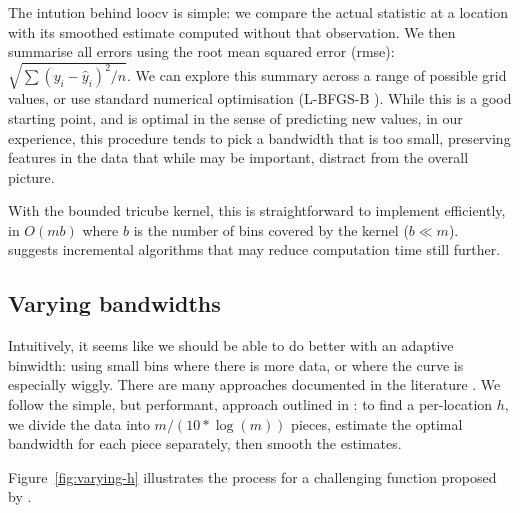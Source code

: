 \documentclass[journal]{vgtc}                %
\begin{document}
The intution behind loocv is simple: we compare the actual statistic at a location with its smoothed estimate computed without that observation. We then summarise all errors using the root mean squared error (rmse): $\sqrt{ \sum (y_i - \hat{y}_i)^2 / n}$. We can explore this summary across a range of possible grid values, or use standard numerical optimisation (L-BFGS-B \citep{byrd:1995}). While this is a good starting point, and is optimal in the sense of predicting new values, in our experience, this procedure tends to pick a bandwidth that is too small, preserving features in the data that while may be important, distract from the overall picture.

With the bounded tricube kernel, this is straightforward to implement efficiently, in $O(m b)$ where $b$ is the number of bins covered by the kernel ($b \ll m$). \citep{fan:1994} suggests incremental algorithms that may reduce computation time still further.

\subsection{Varying bandwidths}

Intuitively, it seems like we should be able to do better with an adaptive binwidth: using small bins where there is more data, or where the curve is especially wiggly. There are many approaches documented in the literature  \citep{terrell:1992, brockmann:1993,schucany:1995,herrmann:1997}. We follow the simple, but performant, approach outlined in \citep{fan:1995}: to find a per-location $h$, we divide the data into $m / (10 * \log(m))$ pieces, estimate the optimal bandwidth for each piece separately, then smooth the estimates.

Figure~\ref{fig:varying-h} illustrates the process for a challenging function proposed by \citep{fan:1995}. 
\end{document}
